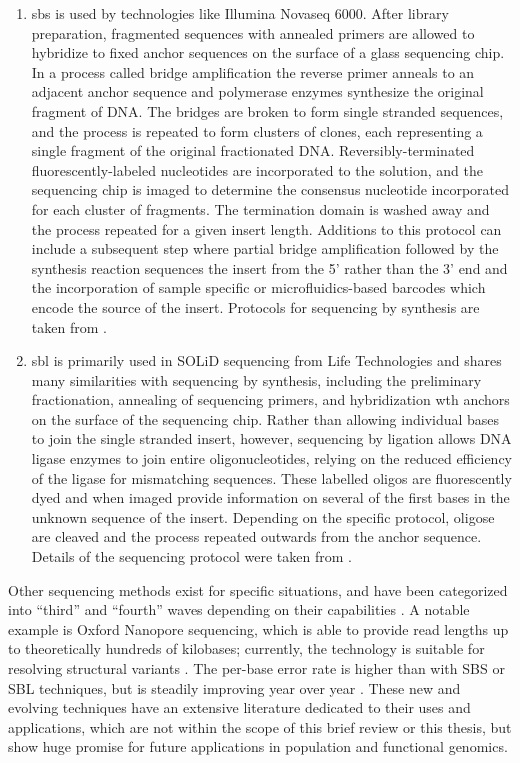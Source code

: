 \begin{enumerate}
    \item \Gls{sbs} is used by technologies like Illumina Novaseq 6000. After library preparation, fragmented sequences with annealed primers are allowed to hybridize to fixed anchor sequences on the surface of a glass sequencing chip. In a process called bridge amplification the reverse primer anneals to an adjacent anchor sequence and polymerase enzymes synthesize the original fragment of DNA. The bridges are broken to form single stranded sequences, and the process is repeated to form clusters of clones, each representing a single fragment of the original fractionated DNA. Reversibly-terminated fluorescently-labeled nucleotides are incorporated to the solution, and the sequencing chip is imaged to determine the consensus nucleotide incorporated for each cluster of fragments. The termination domain is washed away and the process repeated for a given insert length. Additions to this protocol can include a subsequent step where partial bridge amplification followed by the synthesis reaction sequences the insert from the 5' rather than the 3' end and the incorporation of sample specific or microfluidics-based barcodes which encode the source of the insert. Protocols for sequencing by synthesis are taken from \textcite{Illumina}.
    \item \Gls{sbl} is primarily used in SOLiD sequencing from Life Technologies and shares many similarities with sequencing by synthesis, including the preliminary fractionation, annealing of sequencing primers, and hybridization wth anchors on the surface of the sequencing chip. Rather than allowing individual bases to join the single stranded insert, however, sequencing by ligation allows DNA ligase enzymes to join entire oligonucleotides, relying on the reduced efficiency of the ligase for mismatching sequences. These labelled oligos are fluorescently dyed and when imaged provide information on several of the first bases in the unknown sequence of the insert. Depending on the specific protocol, oligose are cleaved and the process repeated outwards from the anchor sequence. Details of the sequencing protocol were taken from \textcite{Slatko2018}.
\end{enumerate}

Other sequencing methods exist for specific situations, and have been categorized into ``third'' and ``fourth'' waves depending on their capabilities \cite{Slatko2018}. A notable example is Oxford Nanopore sequencing, which is able to provide read lengths up to theoretically hundreds of kilobases; currently, the technology is suitable for resolving structural variants \cite{AByrne2019,Bayega2018}. The per-base error rate is higher than with SBS or SBL techniques, but is steadily improving year over year \cite{Sahlin2021}. These new and evolving techniques have an extensive literature dedicated to their uses and applications, which are not within the scope of this brief review or this thesis, but show huge promise for future applications in population and functional genomics. 

